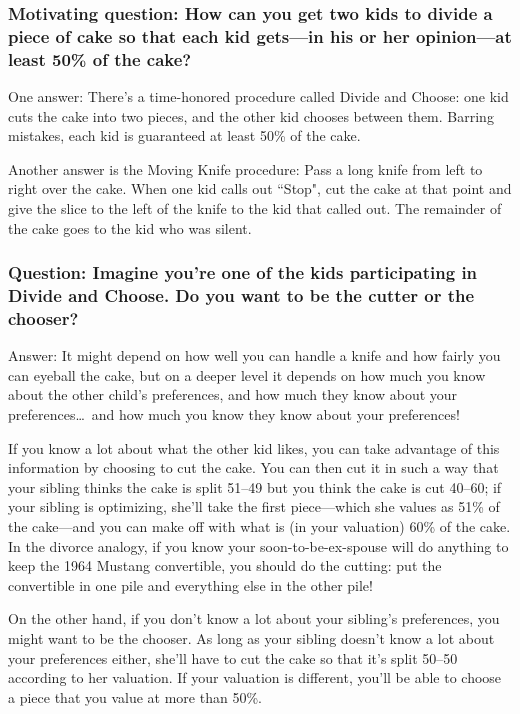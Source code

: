 \subsubsection{Motivating question\rm : How can you get two kids to divide a piece of cake so that each kid gets---in his or her opinion---at least 50\% of the cake?}

One answer: There's a time-honored procedure called Divide and Choose: one kid cuts the cake into two pieces, and the other kid chooses between them. Barring mistakes, each kid is guaranteed at least 50\% of the cake.

\medskip

\noindent Another answer is the Moving Knife procedure: Pass a long knife from left to right over the cake. When one kid calls out ``Stop", cut the cake at that point and give the slice to the left of the knife to the kid that called out. The remainder of the cake goes to the kid who was silent.


\subsubsection{Question\rm : Imagine you're one of the kids participating in Divide and Choose. Do you want to be the cutter or the chooser?}

Answer: It might depend on how well you can handle a knife and how fairly you can eyeball the cake, but on a deeper level it depends on how much you know about the other child's preferences, and how much they know about your preferences\ldots\ and how much you know they know about your preferences!

If you know a lot about what the other kid likes, you can take advantage of this information by choosing to cut the cake. You can then cut it in such a way that your sibling thinks the cake is split 51--49 but you think the cake is cut 40--60; if your sibling is optimizing, she'll take the first piece---which she values as 51\% of the cake---and you can make off with what is (in your valuation) 60\% of the cake. In the divorce analogy, if you know your soon-to-be-ex-spouse will do anything to keep the 1964 Mustang convertible, you should do the cutting: put the convertible in one pile and everything else in the other pile!

On the other hand, if you don't know a lot about your sibling's preferences, you might want to be the chooser. As long as your sibling doesn't know a lot about your preferences either, she'll have to cut the cake so that it's split 50--50 according to her valuation. If your valuation is different, you'll be able to choose a piece that you value at more than 50\%.



